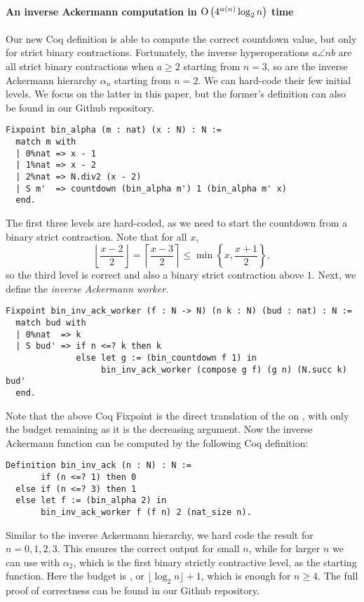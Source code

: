 \paragraph*{An inverse Ackermann computation in $\text{O}\left(4^{\alpha(n)}\log_2 n\right)$ time}
Our new Coq definition is able to compute the correct countdown value, but only for strict binary contractions. Fortunately, the inverse hyperoperations $a\angle{n}b$ are all strict binary contractions when $a\ge 2$ starting from $n = 3$, so are the inverse Ackermann hierarchy $\alpha_n$ starting from $n = 2$. We can hard-code their few initial levels. We focus on the latter in this paper, but the former's definition can also be found in our Github repository.
\begin{lstlisting}
Fixpoint bin_alpha (m : nat) (x : N) : N :=
  match m with
  | 0%nat => x - 1
  | 1%nat => x - 2
  | 2%nat => N.div2 (x - 2)
  | S m'  => countdown (bin_alpha m') 1 (bin_alpha m' x)
  end.
\end{lstlisting}
The first three levels are hard-coded, as we need to start the countdown from a binary strict contraction. Note that for all $x$,
\begin{equation*}
\left\lfloor \frac{x - 2}{2} \right\rfloor = \left\lceil \frac{x - 3}{2} \right\rceil \le \min\left\{x, \frac{x + 1}{2}\right\},
\end{equation*}
so the third level is correct and also a binary strict contraction above $1$. Next, we define the \emph{inverse Ackermann worker}.
\begin{lstlisting}
Fixpoint bin_inv_ack_worker (f : N -> N) (n k : N) (bud : nat) : N :=
  match bud with
  | 0%nat  => k
  | S bud' => if n <=? k then k
              else let g := (bin_countdown f 1) in
                   bin_inv_ack_worker (compose g f) (g n) (N.succ k) bud'
  end.
\end{lstlisting}
Note that the above Coq Fixpoint is the direct translation of the  on , with only the budget remaining  as it is the decreasing argument. Now the inverse Ackermann function can be computed by the following Coq definition:
\begin{lstlisting}
Definition bin_inv_ack (n : N) : N :=
       if (n <=? 1) then 0
  else if (n <=? 3) then 1
  else let f := (bin_alpha 2) in
       bin_inv_ack_worker f (f n) 2 (nat_size n).
\end{lstlisting}
Similar to the inverse Ackermann hierarchy, we hard code the result for $n = 0,1,2,3$. This ensures the correct output for small $n$, while for larger $n$ we can use  with $\alpha_2$, which is the first binary strictly contractive level, as the starting function. Here the budget is , or $\lfloor \log_2n \rfloor + 1$, which is enough for $n\ge 4$. The full proof of correctness can be found in our Github repository.

